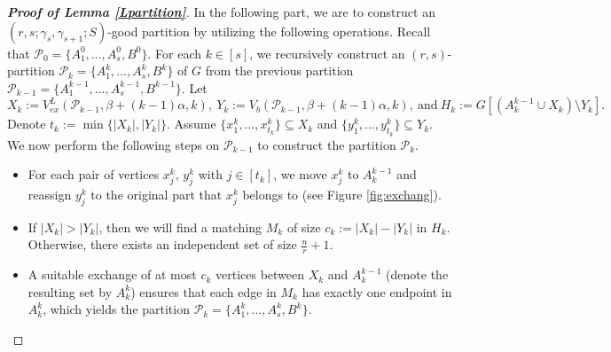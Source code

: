 \documentclass[11pt, a4paper]{article}
\theoremstyle{definition}
\newcommand{\<}{\subseteq}
\begin{document}
\begin{proof}[\bf Proof of Lemma \ref{Lpartition}]
In the following part, we are to construct an $(r,s;\gamma_s,\gamma_{s+1}; S)$-good partition by utilizing the following operations. Recall that   $\mathcal{P}_0=\{A_1^0,\ldots,A_s^0,B^0\}$. For each $k\in [s]$, we recursively construct an $(r,s)$-partition $\mathcal{P}_k=\{A_1^k,\ldots,A_s^k,B^k\}$ of $G$ from the previous partition $\mathcal{P}_{k-1}=\{A_1^{k-1},\ldots,A_s^{k-1},B^{k-1}\}$. %
Let 
$$
X_k:=V_{ex}^L(\mathcal{P}_{k-1},\beta+(k-1)\alpha,k),\ Y_k:=V_b(\mathcal{P}_{k-1},\beta+(k-1)\alpha,k),\ \text{and}\ H_k:=G[(A_k^{k-1}\cup X_k) \setminus Y_k].$$ Denote $t_k:=\min \{|X_k|,|Y_k|\}$. Assume  $\{x_1^k,\dots , x_{t_k}^k\}\subseteq X_k$ and $\{y_1^k,\dots, y_{t_k}^k\}\subseteq Y_k$. We now perform the following steps  on $\mathcal{P}_{k-1}$ to construct the partition  $\mathcal{P}_{k}$.
\begin{itemize}
    \item For each pair of vertices $x_j^k,\,y_j^k$ with $j\in [t_k]$, we move $x_j^k$ to $A_k^{k-1}$ and reassign $y_j^k$ to the original part that $x_j^k$ belongs to (see Figure \ref{fig:exchang}).%
    \item If $|X_k|>|Y_k|$,  then we will find a matching $M_k$ of size $c_k:=|X_k|-|Y_k|$ in $H_k$. Otherwise, there exists an independent set of size $\frac{n}{r}+1$.
    \item A suitable exchange of at most $c_k$ vertices between $X_k$ and  $A_k^{k-1}$ (denote the resulting set by $A_k^k$) ensures that each edge in $M_k$ has exactly one endpoint in $A_k^k$, which yields the partition $\mathcal{P}_{k}=\{A_1^k,\ldots,A_s^k,B^k\}$. %
\end{itemize} 

\end{proof}
\end{document}
